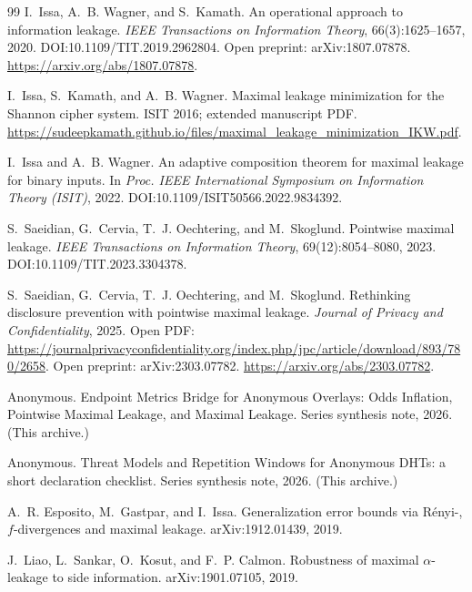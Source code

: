 \documentclass[11pt]{article}
\begin{document}
\begin{thebibliography}{99}
I.~Issa, A.~B. Wagner, and S.~Kamath.
\newblock An operational approach to information leakage.
\newblock \emph{IEEE Transactions on Information Theory}, 66(3):1625--1657, 2020.
\newblock DOI:10.1109/TIT.2019.2962804.
\newblock Open preprint: arXiv:1807.07878. \url{https://arxiv.org/abs/1807.07878}.

I.~Issa, S.~Kamath, and A.~B. Wagner.
\newblock Maximal leakage minimization for the Shannon cipher system.
\newblock ISIT 2016; extended manuscript PDF. \url{https://sudeepkamath.github.io/files/maximal_leakage_minimization_IKW.pdf}.

I.~Issa and A.~B. Wagner.
\newblock An adaptive composition theorem for maximal leakage for binary inputs.
\newblock In \emph{Proc. IEEE International Symposium on Information Theory (ISIT)}, 2022.
\newblock DOI:10.1109/ISIT50566.2022.9834392.

S.~Saeidian, G.~Cervia, T.~J. Oechtering, and M.~Skoglund.
\newblock Pointwise maximal leakage.
\newblock \emph{IEEE Transactions on Information Theory}, 69(12):8054--8080, 2023.
\newblock DOI:10.1109/TIT.2023.3304378.

S.~Saeidian, G.~Cervia, T.~J. Oechtering, and M.~Skoglund.
\newblock Rethinking disclosure prevention with pointwise maximal leakage.
\newblock \emph{Journal of Privacy and Confidentiality}, 2025.
\newblock Open PDF: \url{https://journalprivacyconfidentiality.org/index.php/jpc/article/download/893/780/2658}.
\newblock Open preprint: arXiv:2303.07782. \url{https://arxiv.org/abs/2303.07782}.

Anonymous.
\newblock Endpoint Metrics Bridge for Anonymous Overlays: Odds Inflation, Pointwise Maximal Leakage, and Maximal Leakage.
\newblock Series synthesis note, 2026. (This archive.)

Anonymous.
\newblock Threat Models and Repetition Windows for Anonymous DHTs: a short declaration checklist.
\newblock Series synthesis note, 2026. (This archive.)

A.~R. Esposito, M.~Gastpar, and I.~Issa.
\newblock Generalization error bounds via R\'enyi-, $f$-divergences and maximal leakage.
\newblock arXiv:1912.01439, 2019.

J.~Liao, L.~Sankar, O.~Kosut, and F.~P. Calmon.
\newblock Robustness of maximal $\alpha$-leakage to side information.
\newblock arXiv:1901.07105, 2019.


\end{thebibliography}
\end{document}
